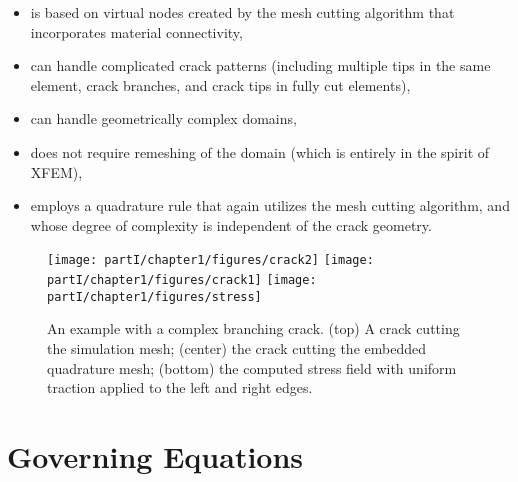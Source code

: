\begin{itemize}
\item is based on virtual nodes created by the mesh cutting algorithm that incorporates material connectivity,
\item can handle complicated crack patterns (including multiple tips in the same element, crack branches, and crack tips in fully cut elements),
\item can handle geometrically complex domains,
\item does not require remeshing of the domain (which is entirely in the spirit of XFEM),
\item employs a quadrature rule that again utilizes the mesh cutting algorithm, and whose degree of complexity is independent of the crack geometry.
\end{itemize}

\setlength{\figurewidth}{0.79\textwidth}
\begin{figure}[htbp]
\centering
\texttt{[image: partI/chapter1/figures/crack2]}
\texttt{[image: partI/chapter1/figures/crack1]}
\texttt{[image: partI/chapter1/figures/stress]}
\caption{An example with a complex branching crack. (top) A crack cutting the simulation mesh; (center) the crack cutting the embedded quadrature mesh; (bottom) the computed stress field with uniform traction applied to the left and right edges.}
\label{fig:chap1.introexample}
\end{figure}

\section{Governing Equations}

